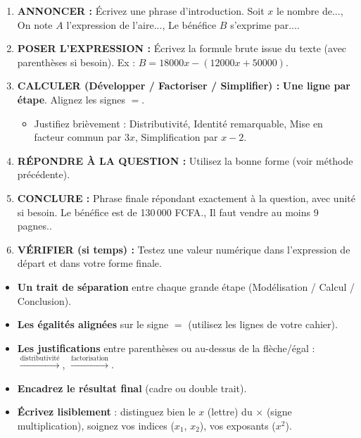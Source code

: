 \documentclass[11pt]{article}
\begin{document}
\begin{methode}
\begin{enumerate}
    \item \textbf{ANNONCER :} Écrivez une phrase d'introduction. \og{}Soit $x$ le nombre de...\fg{}, \og{}On note $A$ l'expression de l'aire...\fg{}, \og{}Le bénéfice $B$ s'exprime par...\fg{}.
    \item \textbf{POSER L'EXPRESSION :} Écrivez la formule brute issue du texte (avec parenthèses si besoin). Ex : $B = 18000x - (12000x + 50000)$.
    \item \textbf{CALCULER (Développer / Factoriser / Simplifier) :} \textbf{Une ligne par étape}. Alignez les signes $=$.
        \begin{itemize}
            \item Justifiez brièvement : \og{}Distributivité\fg{}, \og{}Identité remarquable\fg{}, \og{}Mise en facteur commun par $3x$\fg{}, \og{}Simplification par $x-2$\fg{}.
        \end{itemize}
    \item \textbf{RÉPONDRE À LA QUESTION :} Utilisez la bonne forme (voir méthode précédente).
    \item \textbf{CONCLURE :} Phrase finale répondant exactement à la question, avec unité si besoin. \og{}Le bénéfice est de 130\,000 FCFA.\fg{}, \og{}Il faut vendre au moins 9 pagnes.\fg{}.
    \item \textbf{VÉRIFIER (si temps) :} Testez une valeur numérique dans l'expression de départ et dans votre forme finale.
\end{enumerate}
\end{methode}

\begin{aretenir}
\begin{itemize}
    \item \textbf{Un trait de séparation} entre chaque grande étape (Modélisation / Calcul / Conclusion).
    \item \textbf{Les égalités alignées} sur le signe $=$ (utilisez les lignes de votre cahier).
    \item \textbf{Les justifications} entre parenthèses ou au-dessus de la flèche/égal : $\xrightarrow{\text{distributivité}}$, $\xrightarrow{\text{factorisation}}$.
    \item \textbf{Encadrez le résultat final} (cadre ou double trait).
    \item \textbf{Écrivez lisiblement} : distinguez bien le $x$ (lettre) du $\times$ (signe multiplication), soignez vos indices ($x_1$, $x_2$), vos exposants ($x^2$).
\end{itemize}
\end{aretenir}
\end{document}
